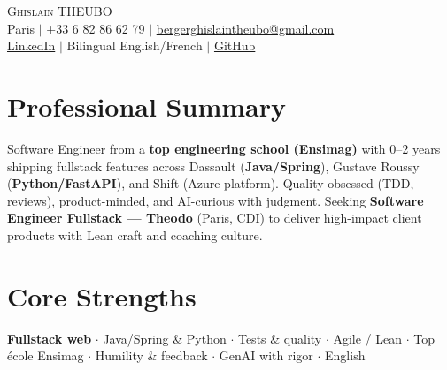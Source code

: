 \documentclass[letterpaper,10.5pt]{article}
\begin{document}
\begin{center}
{\Huge \scshape Ghislain THEUBO} \\ \vspace{2pt}
\small Paris $|$ +33 6 82 86 62 79 $|$ \href{mailto:bergerghislaintheubo@gmail.com}{bergerghislaintheubo@gmail.com} \\
\href{https://www.linkedin.com/in/berger-ghislain}{LinkedIn} $|$ Bilingual English/French $|$ \href{https://github.com/Bergerghislain}{GitHub}
\end{center}
\vspace{-6pt}
\section{Professional Summary}
\small{Software Engineer from a \textbf{top engineering school (Ensimag)} with 0--2 years shipping fullstack features across Dassault (\textbf{Java/Spring}), Gustave Roussy (\textbf{Python/FastAPI}), and Shift (Azure platform). Quality-obsessed (TDD, reviews), product-minded, and AI-curious with judgment. Seeking \textbf{Software Engineer Fullstack --- Theodo} (Paris, CDI) to deliver high-impact client products with Lean craft and coaching culture.}
\section{Core Strengths}
\small{\textbf{Fullstack web} $\cdot$ Java/Spring \& Python $\cdot$ Tests \& quality $\cdot$ Agile / Lean $\cdot$ Top \'ecole Ensimag $\cdot$ Humility \& feedback $\cdot$ GenAI with rigor $\cdot$ English}
\end{document}
